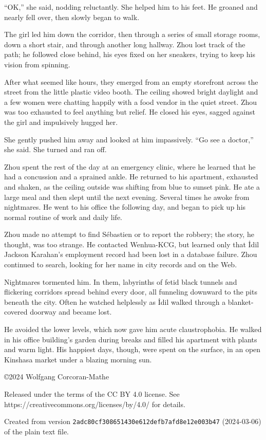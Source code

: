 \documentclass[10pt,b5paper]{article}
\begin{document}
``OK,'' she said, nodding reluctantly. She helped him to his feet. He
groaned and nearly fell over, then slowly began to walk.

The girl led him down the corridor, then through a series of small
storage rooms, down a short stair, and through another long hallway.
Zhou lost track of the path; he followed close behind, his eyes
fixed on her sneakers, trying to keep his vision from spinning.

After what seemed like hours, they emerged from an empty storefront
across the street from the little plastic video booth. The ceiling
showed bright daylight and a few women were chatting happily with
a food vendor in the quiet street. Zhou was too exhausted to feel
anything but relief. He closed his eyes, sagged against the girl
and impulsively hugged her.

She gently pushed him away and looked at him impassively. ``Go see
a doctor,'' she said. She turned and ran off.

\bigskip

Zhou spent the rest of the day at an emergency clinic, where he
learned that he had a concussion and a sprained ankle. He returned
to his apartment, exhausted and shaken, as the ceiling outside was
shifting from blue to sunset pink. He ate a large meal and then slept
until the next evening. Several times he awoke from nightmares.
He went to his office the following day, and began to pick up his
normal routine of work and daily life.

Zhou made no attempt to find S\'{e}bastien or to report the robbery;
the story, he thought, was too strange. He contacted Wenhua-KCG,
but learned only that \.{I}dil Jackson Karahan's employment record
had been lost in a database failure. Zhou continued to search,
looking for her name in city records and on the Web.

Nightmares tormented him. In them, labyrinths of fetid black tunnels
and flickering corridors spread behind every door, all funneling
downward to the pits beneath the city. Often he watched helplessly
as \.{I}dil walked through a blanket-covered doorway and became lost.

He avoided the lower levels, which now gave him acute claustrophobia.
He walked in his office building's garden during breaks and filled
his apartment with plants and warm light. His happiest days, though,
were spent on the surface, in an open Kinshasa market under a
blazing morning sun.

\vfill
\begin{flushleft}
\setlength{\parskip}{\baselineskip}
\copyright 2024 Wolfgang Corcoran-Mathe

Released under the terms of the CC BY 4.0 license. See
https://creativecommons.org/licenses/by/4.0/ for details.

Created from version
\texttt{2adc80cf308651430e612defb7afd8e12e003b47} (2024-03-06) of the
plain text file.
\end{flushleft}
\end{document}

